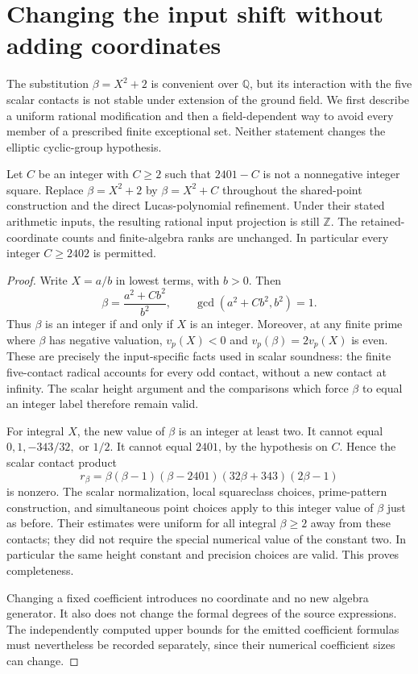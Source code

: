 \section{Changing the input shift without adding coordinates}
\label{sec:p3-beta-shift}

The substitution $\beta=X^2+2$ is convenient over $\mathbb Q$, but its
interaction with the five scalar contacts is not stable under extension
of the ground field. We first describe a uniform rational modification
and then a field-dependent way to avoid every member of a prescribed
finite exceptional set. Neither statement changes the elliptic
cyclic-group hypothesis.

\begin{proposition}\label{p3:integer-shift}
Let $C$ be an integer with $C\ge2$ such that $2401-C$ is not a
nonnegative integer square. Replace $\beta=X^2+2$ by
$\beta=X^2+C$ throughout the shared-point construction and the direct
Lucas-polynomial refinement. Under their stated arithmetic inputs,
the resulting rational input projection is still $\mathbb Z$.
The retained-coordinate counts and finite-algebra ranks are unchanged.
In particular every integer $C\ge2402$ is permitted.
\end{proposition}
\begin{proof}
Write $X=a/b$ in lowest terms, with $b>0$. Then
\[
                \beta=\frac{a^2+Cb^2}{b^2},
          \qquad \gcd(a^2+Cb^2,b^2)=1.
\]
Thus $\beta$ is an integer if and only if $X$ is an integer.
Moreover, at any finite prime where $\beta$ has negative valuation,
$v_p(X)<0$ and $v_p(\beta)=2v_p(X)$ is even. These are precisely
the input-specific facts used in scalar soundness: the finite
five-contact radical accounts for every odd contact, without a new
contact at infinity. The scalar height argument and the comparisons
which force $\beta$ to equal an integer label therefore remain valid.

For integral $X$, the new value of $\beta$ is an integer at least
two. It cannot equal $0,1,-343/32,$ or $1/2$. It cannot equal
$2401$, by the hypothesis on $C$. Hence the scalar contact product
\[
 r_\beta=\beta(\beta-1)(\beta-2401)(32\beta+343)(2\beta-1)
\]
is nonzero. The scalar normalization, local squareclass choices,
prime-pattern construction, and simultaneous point choices apply
to this integer value of $\beta$ just as before. Their estimates
were uniform for all integral $\beta\ge2$ away from these contacts;
they did not require the special numerical value of the constant
two. In particular the same height constant and precision choices
are valid. This proves completeness.

Changing a fixed coefficient introduces no coordinate and no new
algebra generator. It also does not change the formal degrees of the
source expressions. The independently computed upper bounds for the
emitted coefficient formulas must nevertheless be recorded separately,
since their numerical coefficient sizes can change.
\end{proof}

